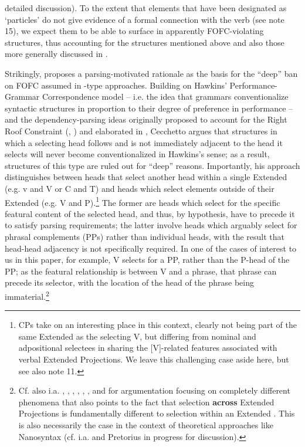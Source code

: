 \documentclass[output=paper]{LSP/langsci}
\begin{document}
detailed discussion). To the extent that elements that have been designated as ‘particles’ do not give evidence of a formal connection with the verb (see note 15), we expect them to be able to surface in apparently FOFC-violating structures, thus accounting for the structures mentioned above and also those more generally discussed in \citet{Biberauer2017optionalv2}. 

Strikingly, \citet{Cecchetto2013} proposes a parsing-motivated rationale as the basis for the “deep” ban on FOFC assumed in -type approaches. Building on Hawkins’ Perfor\-mance-Grammar Correspondence model – i.e. the idea that grammars conventionalize syntactic structures in proportion to their degree of preference in performance – and the dependency-parsing ideas originally proposed to account for the Right Roof Constraint (\citealt{Fodor1978}, \citealt{Rochemont1992}) and elaborated in \citet{AckemaNeeleman2002}, Cecchetto argues that structures in which a selecting head follows and is not immediately adjacent to the head it selects will never become conventionalized in Hawkins’s sense; as a result, structures of this type are ruled out for “deep” reasons. Importantly, his approach distinguishes between heads that select another head within a single Extended  (e.g. v and V or C and T) and heads which select elements outside of their Extended  (e.g. V and P).\footnote{CPs take on an interesting place in this context, clearly not being part of the same Extended  as the selecting V, but differing from nominal and adpositional selectees in sharing the [V]-related features associated with verbal Extended Projections. We leave this challenging case aside here, but see also note 11.} The former are heads which select for the specific featural content of the selected head, and thus, by hypothesis, have to precede it to satisfy parsing requirements; the latter involve heads which arguably select for phrasal complements (PPs) rather than individual heads, with the result that head-head adjacency is not specifically required. In one of the cases of interest to us in this paper, for example, V selects for a PP, rather than the P-head of the PP; as the featural relationship is between V and a phrase, that phrase can precede its selector, with the location of the head of the phrase being immaterial.\footnote{Cf. also i.a. \citet{Baltin1989}, \citet{Payne1993}, \citet{Williams2003}, \citet{Sportiche2005}, \citet{Bruening2009}, \citet{Fowlie2014}, and \citet{BrueningEtAl2015} for argumentation focusing on completely different phenomena that also points to the fact that selection \textbf{across} Extended Projections is fundamentally different to selection within an Extended . This is also necessarily the case in the context of theoretical approaches like Nanosyntax (cf. i.a. \citealt{Starke2009} and Pretorius in progress for discussion).}
\end{document}
